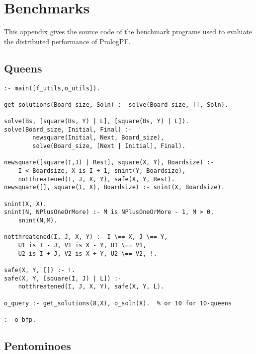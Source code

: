 \chapter{Benchmarks}
\label{benchmarks}

This appendix gives the source code of the benchmark programs used to
evaluate the distributed performance of PrologPF.

\section{Queens} %
\label{queens_benchmark}

\begin{verbatim}
:- main([f_utils,o_utils]).

get_solutions(Board_size, Soln) :- solve(Board_size, [], Soln). 

solve(Bs, [square(Bs, Y) | L], [square(Bs, Y) | L]).
solve(Board_size, Initial, Final) :-
		newsquare(Initial, Next, Board_size),
		solve(Board_size, [Next | Initial], Final).

newsquare([square(I,J) | Rest], square(X, Y), Boardsize) :-
	I < Boardsize, X is I + 1, snint(Y, Boardsize),
	notthreatened(I, J, X, Y), safe(X, Y, Rest).
newsquare([], square(1, X), Boardsize) :- snint(X, Boardsize).

snint(X, X).
snint(N, NPlusOneOrMore) :- M is NPlusOneOrMore - 1, M > 0,
	snint(N,M).

notthreatened(I, J, X, Y) :- I \== X, J \== Y, 
	U1 is I - J, V1 is X - Y, U1 \== V1,
	U2 is I + J, V2 is X + Y, U2 \== V2, !.

safe(X, Y, []) :- !.
safe(X, Y, [square(I, J) | L]) :-
	notthreatened(I, J, X, Y), safe(X, Y, L).

o_query :- get_solutions(8,X), o_soln(X).  % or 10 for 10-queens

:- o_bfp.
\end{verbatim}

\section{Pentominoes} %
\label{pent_benchmark}

